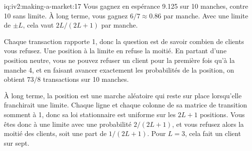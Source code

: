 \begin{solution}{iq:iv2:making-a-market:17}
Vous gagnez en espérance 9.125 sur 10 manches, contre 10 sans limite. À long terme, vous gagnez $6/7 \approx 0.86$ par manche. Avec une limite de $\pm L$, cela vaut $2L/(2L + 1)$ par manche.

Chaque transaction rapporte 1, donc la question est de savoir combien de clients vous refusez. Une position à la limite en refuse la moitié. En partant d'une position neutre, vous ne pouvez refuser un client pour la première fois qu'à la manche 4, et en faisant avancer exactement les probabilités de la position, on obtient $73/8$ transactions sur 10 manches.

À long terme, la position est une marche aléatoire qui reste sur place lorsqu'elle franchirait une limite. Chaque ligne et chaque colonne de sa matrice de transition somment à 1, donc sa loi stationnaire est uniforme sur les $2L + 1$ positions. Vous êtes donc à une limite avec une probabilité $2/(2L + 1)$, et vous refusez alors la moitié des clients, soit une part de $1/(2L + 1)$. Pour $L = 3$, cela fait un client sur sept.

\end{solution}

